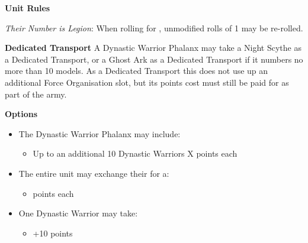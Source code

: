 \begin{minipage}[t]{0.72\textwidth}
	\vspace*{2em}
	\textbf{Unit Rules}
	
	\textit{Their Number is Legion}: When rolling for , unmodified rolls of 1 may be re-rolled.


	\vspace*{2em}
	\textbf{Dedicated Transport}
	A Dynastic Warrior Phalanx may take a Night Scythe as a Dedicated Transport, or a Ghost Ark as a Dedicated Transport if it numbers no more than 10 models. As a Dedicated Transport this does not use up an additional Force Organisation slot, but its points cost must still be paid for as part of the army.

	\vspace*{2em}
	\textbf{Options}
	\begin{itemize}
		\item The Dynastic Warrior Phalanx may include:
		\begin{itemize}
			\item Up to an additional 10 Dynastic Warriors \dotfill X points each
		\end{itemize}
		\item The entire unit may exchange their  for a:
		\begin{itemize}
			\item {}  points each
		\end{itemize}
		\item One Dynastic Warrior may take:
		\begin{itemize}
			\item {} \dotfill +10 points
		\end{itemize} 
	\end{itemize}
\end{minipage}


\newpage
